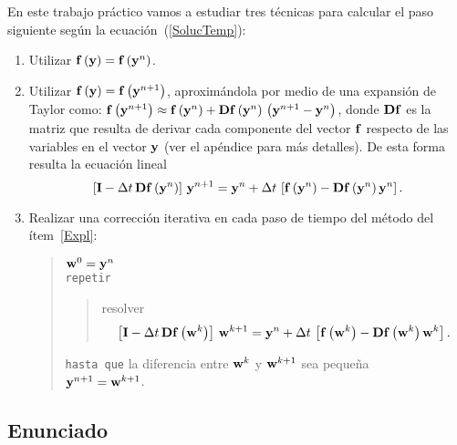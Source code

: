 En este trabajo práctico vamos a estudiar tres técnicas para calcular el paso siguiente según la ecuación~(\ref{SolucTemp}):
\begin{enumerate}[1)]
 \item Utilizar ${\bf f}\left({\bf y}\right) = {\bf f}\left({\bf y}^n\right)$.

 \item \label{Expl} Utilizar ${\bf f}\left({\bf y}\right) = {\bf f}\left({\bf y}^{n+1}\right)$,  aproximándola por medio de una expansión de Taylor como: ${\bf f}\left({\bf y}^{n+1}\right) \approx {\bf f}\left({\bf y}^{n}\right) + {\bf Df}\left({\bf y}^{n}\right) \, \left({\bf y}^{n+1} - {\bf y}^{n} \right)$, donde ${\bf Df}$ es la matriz que resulta de derivar cada componente del vector ${\bf f}$ respecto de las variables en el vector ${\bf y}$ (ver el apéndice para más detalles). De esta forma resulta la ecuación lineal
  \begin{equation*}
  \left[{\bf I} - \Delta t \, {\bf Df}\left({\bf y}^{n} \right) \right] \, {\bf y}^{n+1} = {\bf y}^n + \Delta t \, \left[ {\bf f}\left({\bf y}^{n}\right) - {\bf Df}\left({\bf y}^{n} \right) {\bf y}^{n} \right].
  \end{equation*}

 \item Realizar una corrección iterativa en cada paso de tiempo del método del ítem~\ref{Expl}: 
\begin{quote} 
	\noindent ${\bf w}^{0} = {\bf y}^{n}$ \\
	\texttt{repetir} \\
	\begin{quote} 
		\noindent resolver \\
		\begin{equation*}
		\left[{\bf I} - \Delta t \, {\bf Df}\left({\bf w}^{k} \right) \right] \, {\bf w}^{k+1} = {\bf y}^n + \Delta t \, \left[ {\bf f}\left({\bf w}^{k} \right) - {\bf Df}\left({\bf w}^{k} \right) {\bf w}^{k} \right].
		\end{equation*}		
	\end{quote} 
	\texttt{hasta que} la diferencia entre ${\bf w}^{k}$ y ${\bf w}^{k+1}$ sea pequeña \\
	${\bf y}^{n+1} = {\bf w}^{k+1}$.
\end{quote} 
\end{enumerate}

\subsection*{Enunciado}

